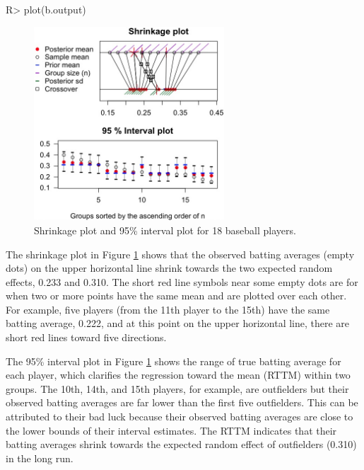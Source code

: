 \documentclass[article]{jss}
\begin{document}
\begin{CodeChunk}
\begin{CodeInput}
R> plot(b.output)
\end{CodeInput}
\end{CodeChunk}
\begin{figure}[h!]
\begin{center}
\includegraphics[width = 2.8in]{baseball1.png}
\caption{Shrinkage plot and 95\% interval plot for 18 baseball players.}
\label{fig:baseball}
\end{center}
\end{figure}

The shrinkage plot in Figure \ref{fig:baseball} shows that  the observed batting averages (empty dots) on the upper horizontal line shrink towards the two expected random effects, 0.233 and 0.310. The short red line symbols near some empty dots are for when two or more points have the same mean and are plotted over each other. For example, five players (from the 11th player to the 15th) have the same batting average, 0.222, and at this point on the upper horizontal line, there are short red lines toward five directions.



The 95\% interval plot in Figure \ref{fig:baseball} shows the range of true batting average for each player, which clarifies the regression toward the mean (RTTM) within two groups. The 10th, 14th, and 15th players, for example, are outfielders but their observed batting averages are far lower than the first five outfielders. This can  be attributed to their bad luck because their observed batting averages are close to the lower bounds of their interval estimates. The RTTM indicates that their batting averages  shrink towards the expected random effect of outfielders (0.310) in the long run.
\end{document}
